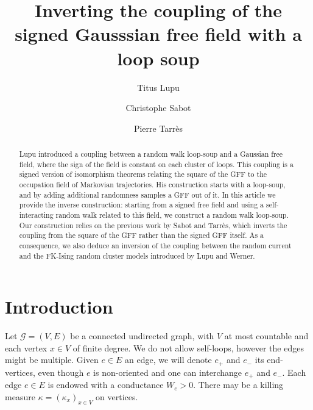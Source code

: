\documentclass[11pt,a4paper]{amsart}
\title{Inverting the coupling of the signed Gausssian free field with a loop soup}
\date{}
\author{Titus Lupu \and Christophe Sabot \and Pierre Tarrès}
\numberwithin{equation}{section}
\begin{document}

\begin{abstract}
Lupu introduced 
a coupling between a random walk loop-soup and a Gaussian free field, where the sign of the field is constant on each cluster of loops. This coupling is a signed version of isomorphism theorems relating the square of the GFF to the occupation field of Markovian trajectories. 
His
construction 
starts with a loop-soup, and by adding additional randomness samples a GFF out of it.
In this article we provide the inverse construction: starting from a signed free field and using a self-interacting random walk related to this field, we construct a random walk loop-soup. Our construction relies on the previous work by Sabot and Tarrès, which inverts the coupling from the square of the GFF rather than the signed GFF itself.
As a consequence, we also deduce an inversion of the coupling between the random current and the FK-Ising random cluster models 
introduced by Lupu and Werner.
\end{abstract}
\maketitle
\section{Introduction}
\label{SecIntro}
Let $\mathcal{G}=(V,E)$ be a connected undirected graph, with $V$ at most countable and each vertex $x\in V$ of finite degree. We do not allow self-loops, however the edges might be multiple. Given $e\in E$ an edge, we will denote
$e_{+}$ and $e_{-}$ its end-vertices, even though $e$ is non-oriented and one can interchange $e_{+}$ and $e_{-}$. 
Each edge $e\in E$ is endowed with a conductance $W_{e}>0$. There may be a killing measure $\kappa=(\kappa_{x})_{x\in V}$ on vertices. 
\end{document}
